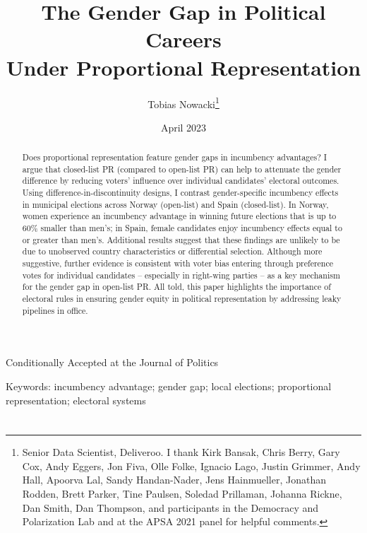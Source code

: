 \documentclass[12pt]{article}
\title{The Gender Gap in Political Careers \\ Under Proportional Representation}
\date{April 2023}
\date{}
\author{Tobias Nowacki\thanks{Senior Data Scientist, Deliveroo. I thank Kirk Bansak, Chris Berry, Gary Cox, Andy Eggers, Jon Fiva, Olle Folke, Ignacio Lago, Justin Grimmer, Andy Hall, Apoorva Lal, Sandy Handan-Nader, Jens Hainmueller, Jonathan Rodden, Brett Parker, Tine Paulsen, Soledad Prillaman, Johanna Rickne, Dan Smith, Dan Thompson, and participants in the Democracy and Polarization Lab and at the APSA 2021 panel for helpful comments.}}
\renewcommand \thepart{}
\renewcommand \partname{}
\begin{document}
%
%

\renewcommand \thepart{}
\renewcommand \partname{}

\maketitle
\thispagestyle{empty}

\begin{center}
    {Conditionally Accepted at the Journal of Politics}
\end{center}

\singlespacing
\begin{abstract}
    Does proportional representation feature gender gaps in incumbency advantages?  I argue that closed-list PR (compared to open-list PR) can help to attenuate the gender difference by reducing voters' influence over individual candidates' electoral outcomes. Using difference-in-discontinuity designs, I contrast gender-specific incumbency effects in municipal elections across Norway (open-list) and Spain (closed-list). In Norway, women experience an incumbency advantage in winning future elections that is up to 60\% smaller than men's; in Spain, female candidates enjoy incumbency effects equal to or greater than men's. Additional results suggest that these findings are unlikely to be due to unobserved country characteristics or differential selection. Although more suggestive, further evidence is consistent with voter bias entering through preference votes for individual candidates -- especially in right-wing parties -- as a key mechanism for the gender gap in open-list PR. All told, this paper highlights the importance of electoral rules in ensuring gender equity in political representation by addressing leaky pipelines in office.
\end{abstract}

Keywords: incumbency advantage; gender gap; local elections; proportional representation; electoral systems

\doparttoc %
\faketableofcontents %

\part{} %


\clearpage
{}
\doublespacing
\end{document}
